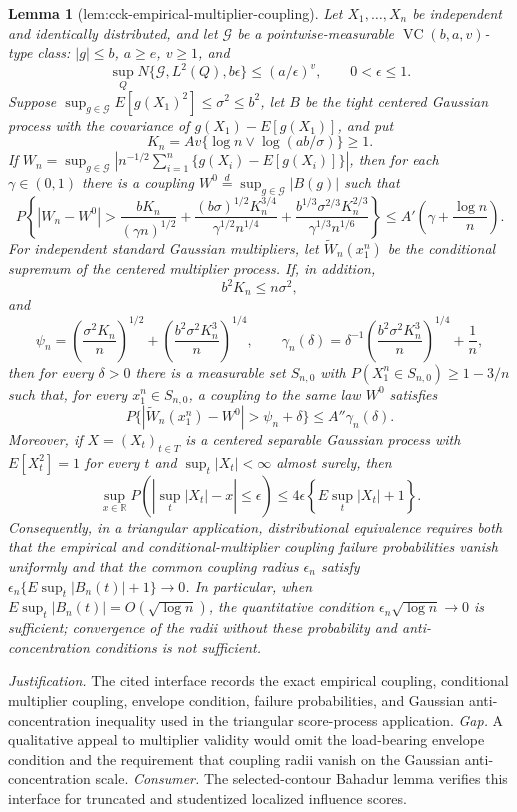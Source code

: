\documentclass{article}
\newtheorem{lemma}{Lemma}
\begin{document}
\begin{lemma}[lem:cck-empirical-multiplier-coupling]\label{lem:cck-empirical-multiplier-coupling}
Let \(X_1,\ldots,X_n\) be independent and identically distributed, and let \(\mathcal G\) be a pointwise-measurable \(\operatorname{VC}(b,a,v)\)-type class: \(|g|\le b\), \(a\ge e\), \(v\ge1\), and
\[
 \sup_Q N\{\mathcal G,L^2(Q),b\epsilon\}\le(a/\epsilon)^v,
 \qquad 0<\epsilon\le1.
\]
Suppose \(\sup_{g\in\mathcal G}E[g(X_1)^2]\le\sigma^2\le b^2\), let \(B\) be the tight centered Gaussian process with the covariance of \(g(X_1)-E[g(X_1)]\), and put
\[
 K_n=Av\{\log n\vee\log(ab/\sigma)\}\ge1.
\]
If \(W_n=\sup_{g\in\mathcal G}|n^{-1/2}\sum_{i=1}^n\{g(X_i)-E[g(X_i)]\}|\), then for each \(\gamma\in(0,1)\) there is a coupling \(W^0\stackrel d=\sup_{g\in\mathcal G}|B(g)|\) such that
\[
 P\left\{|W_n-W^0|>
 \frac{bK_n}{(\gamma n)^{1/2}}+
 \frac{(b\sigma)^{1/2}K_n^{3/4}}{\gamma^{1/2}n^{1/4}}+
 \frac{b^{1/3}\sigma^{2/3}K_n^{2/3}}{\gamma^{1/3}n^{1/6}}
 \right\}
 \le A'\left(\gamma+\frac{\log n}{n}\right).
\]
For independent standard Gaussian multipliers, let \(\widetilde W_n(x_1^n)\) be the conditional supremum of the centered multiplier process. If, in addition,
\[
 b^2K_n\le n\sigma^2,
\]
and
\[
 \psi_n=\left(\frac{\sigma^2K_n}{n}\right)^{1/2}
 +\left(\frac{b^2\sigma^2K_n^3}{n}\right)^{1/4},
 \qquad
 \gamma_n(\delta)=\delta^{-1}
 \left(\frac{b^2\sigma^2K_n^3}{n}\right)^{1/4}+\frac1n,
\]
then for every \(\delta>0\) there is a measurable set \(S_{n,0}\) with \(P(X_1^n\in S_{n,0})\ge1-3/n\) such that, for every \(x_1^n\in S_{n,0}\), a coupling to the same law \(W^0\) satisfies
\[
 P\{|\widetilde W_n(x_1^n)-W^0|>\psi_n+\delta\}
 \le A''\gamma_n(\delta).
\]
Moreover, if \(X=(X_t)_{t\in T}\) is a centered separable Gaussian process with \(E[X_t^2]=1\) for every \(t\) and \(\sup_t|X_t|<\infty\) almost surely, then
\[
 \sup_{x\in\mathbb R}P\left(\left|\sup_t|X_t|-x\right|\le\epsilon\right)
 \le4\epsilon\left\{E\sup_t|X_t|+1\right\}.
\]
Consequently, in a triangular application, distributional equivalence requires both that the empirical and conditional-multiplier coupling failure probabilities vanish uniformly and that the common coupling radius \(\epsilon_n\) satisfy \(\epsilon_n\{E\sup_t|B_n(t)|+1\}\to0\). In particular, when \(E\sup_t|B_n(t)|=O(\sqrt{\log n})\), the quantitative condition \(\epsilon_n\sqrt{\log n}\to0\) is sufficient; convergence of the radii without these probability and anti-concentration conditions is not sufficient.
\end{lemma}
\par\smallskip\noindent \textit{Justification.} The cited interface records the exact empirical coupling, conditional multiplier coupling, envelope condition, failure probabilities, and Gaussian anti-concentration inequality used in the triangular score-process application. \textit{Gap.} A qualitative appeal to multiplier validity would omit the load-bearing envelope condition and the requirement that coupling radii vanish on the Gaussian anti-concentration scale. \textit{Consumer.} The selected-contour Bahadur lemma verifies this interface for truncated and studentized localized influence scores.
\end{document}
